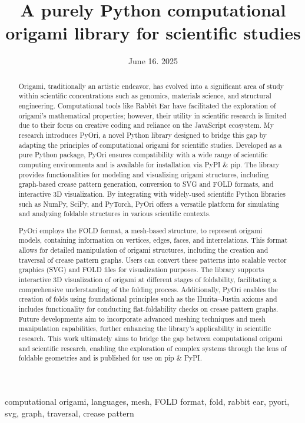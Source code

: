 \documentclass[12pt,conference,onecolumn]{IEEEtran}
\title{A purely {P}ython computational origami library for scientific studies}
\author{%
\IEEEauthorblockN{Pooja Thaker}\IEEEauthorblockA{Science \& Engineering\\Manalapan High School\\Englishtown, NJ\\425pthaker@frhsd.com}}
\date{June 16. 2025}
\newcommand{\keywords}{computational origami, languages, mesh, FOLD format, fold, rabbit ear, pyori, svg, graph, traversal, crease pattern}
\begin{document}
\maketitle 

\begin{abstract}
Origami, traditionally an artistic endeavor, has evolved into a significant area of study within scientific concentrations such as genomics, materials science, and structural engineering. Computational tools like Rabbit Ear have facilitated the exploration of origami's mathematical properties; however, their utility in scientific research is limited due to their focus on creative coding and reliance on the JavaScript ecosystem. My research introduces PyOri, a novel Python library designed to bridge this gap by adapting the principles of computational origami for scientific studies. Developed as a pure Python package, PyOri ensures compatibility with a wide range of scientific computing environments and is available for installation via PyPI \& pip. The library provides functionalities for modeling and visualizing origami structures, including graph-based crease pattern generation, conversion to SVG and FOLD formats, and interactive 3D visualization. By integrating with widely-used scientific Python libraries such as NumPy, SciPy, and PyTorch, PyOri offers a versatile platform for simulating and analyzing foldable structures in various scientific contexts.

PyOri employs the FOLD format, a mesh-based structure, to represent origami models, containing information on vertices, edges, faces, and interrelations. This format allows for detailed manipulation of origami structures, including the creation and traversal of crease pattern graphs. Users can convert these patterns into scalable vector graphics (SVG) and FOLD files for visualization purposes. The library supports interactive 3D visualization of origami at different stages of foldability, facilitating a comprehensive understanding of the folding process. Additionally, PyOri enables the creation of folds using foundational principles such as the Huzita–Justin axioms and includes functionality for conducting flat-foldability checks on crease pattern graphs. Future developments aim to incorporate advanced meshing techniques and mesh manipulation capabilities, further enhancing the library's applicability in scientific research. This work ultimately aims to bridge the gap between computational origami and scientific research, enabling the exploration of complex systems through the lens of foldable geometries and is published for use on pip \& PyPI.\end{abstract}

\begin{IEEEkeywords}
\keywords
\end{IEEEkeywords}
\end{document}
